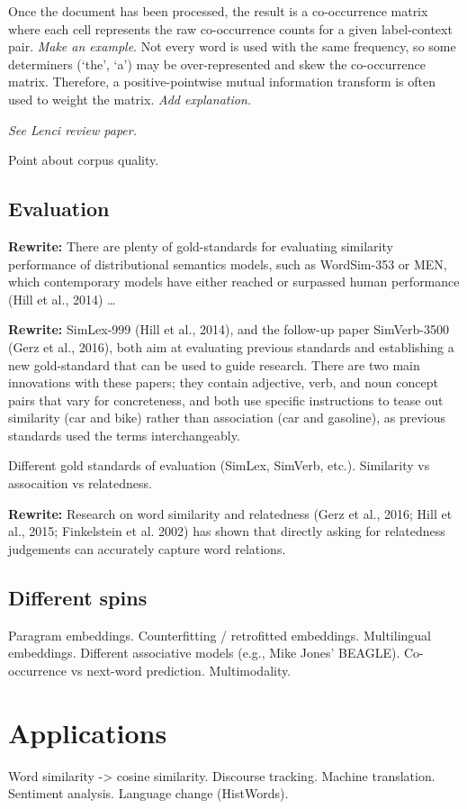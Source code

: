 Once the document has been processed, the result is a co-occurrence matrix where each cell represents the raw co-occurrence counts for a given label-context pair.
\textit{Make an example}.
Not every word is used with the same frequency, so some determiners (`the', `a') may be over-represented and skew the co-occurrence matrix. Therefore, a positive-pointwise mutual information transform is often used to weight the matrix. 
\textit{Add explanation.}

\textit{See Lenci review paper.}

Point about corpus quality.

\subsection{Evaluation}
\textbf{Rewrite:} There are plenty of gold-standards for evaluating similarity performance of distributional semantics models, such as WordSim-353 or MEN, which contemporary models have either reached or surpassed human performance (Hill et al., 2014) \dots 

\textbf{Rewrite:} SimLex-999 (Hill et al., 2014), and the follow-up paper SimVerb-3500 (Gerz et al., 2016), both aim at evaluating previous standards and establishing a new gold-standard that can be used to guide research. There are two main innovations with these papers; they contain adjective, verb, and noun concept pairs that vary for concreteness, and both use specific instructions to tease out similarity (car and bike) rather than association (car and gasoline), as previous standards used the terms interchangeably.

Different gold standards of evaluation (SimLex, SimVerb, etc.).
Similarity vs assocaition vs relatedness.

\textbf{Rewrite:} Research on word similarity and relatedness (Gerz et al., 2016; Hill et al., 2015; Finkelstein et al. 2002) has shown that directly asking for relatedness judgements can accurately capture word relations.

\subsection{Different spins}
Paragram embeddings.
Counterfitting / retrofitted embeddings.
Multilingual embeddings.
Different associative models (e.g., Mike Jones' BEAGLE).
Co-occurrence vs next-word prediction.
Multimodality.

\section{Applications}
Word similarity -> cosine similarity.
Discourse tracking.
Machine translation.
Sentiment analysis.
Language change (HistWords).

